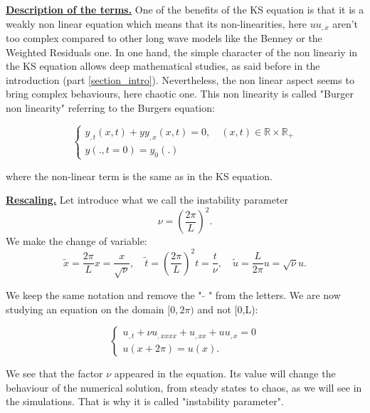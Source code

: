 \documentclass[12pt]{article}
\begin{document}
\underline{\textbf{Description of the terms.}}
One of the benefits of the KS equation is that it is a weakly non linear equation which means that its non-linearities, here $uu_{,x}$ aren't too complex compared 
to other long wave models like the Benney or the Weighted Residuals one. In one hand, the simple character of the non lineariy in the KS equation allows deep
 mathematical studies, as said before in the introduction (part \ref{section_intro}). Nevertheless, the non linear aspect seems to bring complex behaviours, here chaotic 
 one. This non linearity is called "Burger non linearity" referring to the Burgers equation:

\begin{equation*}
    \left\{
    \begin{aligned}
        y_{,t}(x, t) + yy_{,x}(x, t) = 0, \quad  (x,t) \in \mathbb{R}\times \mathbb{R}_+\\
        y(., t=0)=y_0(.)
    \end{aligned}
    \right.
\end{equation*}

where the non-linear term is the same as in the KS equation.

\underline{\textbf{Rescaling.}}
Let introduce what we call the instability parameter \begin{equation}
    \nu = \left( \frac{2\pi}{L}\right)^2.
\end{equation}
We make the change of variable:
\begin{equation}
    \tilde{x}= \frac{2\pi}{L}x = \frac{x}{\sqrt{\nu}},\quad \tilde{t}=\left( \frac{2\pi}{L}\right)^2t =\frac{t}{\nu},\quad  \tilde{u}=\frac{L}{2\pi}u=\sqrt{\nu}u.
\end{equation}

We keep the same notation and remove the " $\tilde{}$ " from the letters. We are now studying an equation on the domain $[0,2\pi)$ and not [0,L): 


\begin{equation}\label{KS_eq_2pi}
\left\{
\begin{aligned}
    u_{,t}  + \nu u_{,xxxx} + u_{,xx} + uu_{,x} = 0 \\
    u(x+2\pi)=u(x). 
\end{aligned}
\right.
\end{equation}

We see that the factor $\nu$ appeared in the equation. Its value will change the behaviour of the numerical solution, from steady states to chaos, as we will 
see in the simulations. That is why it is called "instability parameter".
\\
\end{document}
